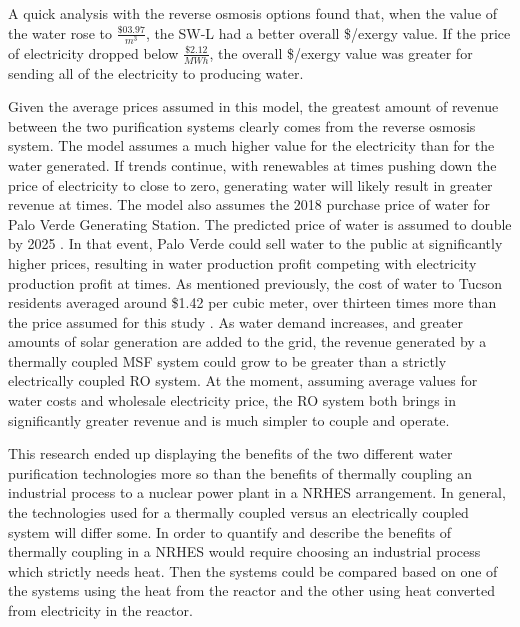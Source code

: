 A quick analysis with the reverse osmosis options found that, when the value of the water rose to $\frac{\$03.97}{m^3}$, the SW-L had a better overall \$/exergy value. If the price of electricity dropped below $\frac{\$2.12}{MWh}$, the overall \$/exergy value was greater for sending all of the electricity to producing water.

	Given the average prices assumed in this model, the greatest amount of revenue between the two purification systems clearly comes from the reverse osmosis system.  The model assumes a much higher value for the electricity than for the water generated.  If trends continue, with renewables at times pushing down the price of electricity to close to zero, generating water will likely result in greater revenue at times.  The model also assumes the 2018 purchase price of water for Palo Verde Generating Station. The predicted price of water is assumed to double by 2025 \cite{Brown2018}.  In that event, Palo Verde could sell water to the public at significantly higher prices, resulting in water production profit competing with electricity production profit at times.  As mentioned previously, the cost of water to Tucson residents averaged around \$1.42 per cubic meter, over thirteen times more than the price assumed for this study \cite{CityofTucson2017}.  As water demand increases, and greater amounts of solar generation are added to the grid, the revenue generated by a thermally coupled MSF system could grow to be greater than a strictly electrically coupled RO system. At the moment, assuming average values for water costs and wholesale electricity price, the RO system both brings in significantly greater revenue and is much simpler to couple and operate.

    This research ended up displaying the benefits of the two different water purification technologies more so than the benefits of thermally coupling an industrial process to a nuclear power plant in a NRHES arrangement.  In general, the technologies used for a thermally coupled versus an electrically coupled system will differ some. In order to quantify and describe the benefits of thermally coupling in a NRHES would require choosing an industrial process which strictly needs heat. Then the systems could be compared based on one of the systems using the heat from the reactor and the other using heat converted from electricity in the reactor.

